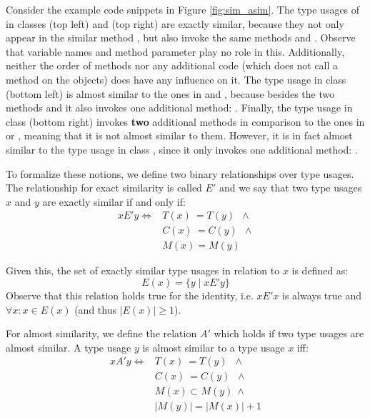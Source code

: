 Consider the example code snippets in Figure \ref{fig:sim_asim}.
The type usages of  in classes  (top left) and  (top right) are exactly similar, because they not only appear in the similar method , but also invoke the same methods  and .
Observe that variable names and method parameter play no role in this.
Additionally, neither the order of methods nor any additional code (which does not call a method on the  objects) does have any influence on it.
The type usage in class  (bottom left) is almost similar to the ones in  and , because besides the two methods  and  it also invokes one additional method: .
Finally, the type usage in class  (bottom right) invokes \textbf{two} additional methods in comparison to the ones in  or , meaning that it is not almost similar to them.
However, it is in fact almost similar to the type usage in class , since it only invokes one additional method: .

To formalize these notions, we define two binary relationships over type usages.
The relationship for exact similarity is called $E'$ and we say that two type usages $x$ and $y$ are exactly similar if and only if:
\begin{align*}
xE'y \iff & T(x) \: = T(y) \;\: \land \\
         & C(x) \: = C(y) \;\: \land \\
         & M(x) = M(y)
\end{align*}

Given this, the set of exactly similar type usages in relation to $x$ is defined as:
\begin{equation*}
E(x) = \{y \mid xE'y \}
\end{equation*}
Observe that this relation holds true for the identity, i.e. $xE'x$ is always true and $\forall x: x \in E(x)$ (and thus $|E(x)| \geq 1$).

For almost similarity, we define the relation $A'$ which holds if two type usages are almost similar.
A type usage $y$ is almost similar to a type usage $x$ iff:
\begin{align*}
xA'y \iff & T(x) \: = T(y) \;\; \land \\
         & C(x) \: = C(y) \;\; \land \\
         & M(x) \subset M(y) \: \land \\
         & |M(y)| = |M(x)| + 1
\end{align*}


